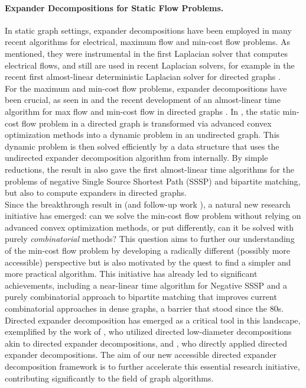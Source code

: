 \documentclass[11pt]{article}
\begin{document}
\paragraph{Expander Decompositions for Static Flow Problems.} In static graph settings, expander decompositions have been employed in many recent algorithms for electrical, maximum flow and min-cost flow problems. As mentioned, they were instrumental in the first Laplacian solver \cite{spielman2004nearly} that computes electrical flows, and still are used in recent Laplacian solvers, for example in the recent first almost-linear deterministic Laplacian solver for directed graphs \cite{kyng2022derandomizing}.\\
For the maximum and min-cost flow problems, expander decompositions have been crucial, as seen in \cite{kelner2014almost,van2020bipartite,van2021minimum,bernstein2022deterministic} and the recent development of an almost-linear time algorithm for max flow and min-cost flow in directed graphs \cite{chen2022maximum}. In \cite{chen2022maximum}, the static min-cost flow problem in a directed graph is transformed via advanced convex optimization methods into a dynamic problem in an undirected graph. This dynamic problem is then solved efficiently by a data structure that uses the undirected expander decomposition algorithm from \cite{saranurak2019expander} internally. By simple reductions, the result in \cite{chen2022maximum} also gave the first almost-linear time algorithms for the problems of negative Single Source Shortest Path (SSSP) and bipartite matching, but also to compute expanders in directed graphs. \\
Since the breakthrough result in \cite{chen2022maximum} (and follow-up work \cite{van2023deterministic, kyng2023dynamic, chen2023almost}), a natural new research initiative has emerged: can we solve the min-cost flow problem without relying on advanced convex optimization methods, or put differently, can it be solved with purely \emph{combinatorial} methods? This question aims to further our understanding of the min-cost flow problem by developing a radically different (possibly more accessible) perspective but is also motivated by the quest to find a simpler and more practical algorithm. This initiative has already led to significant achievements, including a near-linear time algorithm for Negative SSSP \cite{bernstein2022negative} and a purely combinatorial approach to bipartite matching \cite{chuzhoy2024faster} that improves current combinatorial approaches in dense graphs, a barrier that stood since the 80s. \\
Directed expander decomposition has emerged as a critical tool in this landscape, exemplified by the work of \cite{bernstein2022negative}, who utilized directed low-diameter decompositions akin to directed expander decompositions, and \cite{chuzhoy2024faster}, who directly applied directed expander decompositions.
The aim of our new accessible directed expander decomposition framework is to further accelerate this essential research initiative, contributing significantly to the field of graph algorithms.
\end{document}
